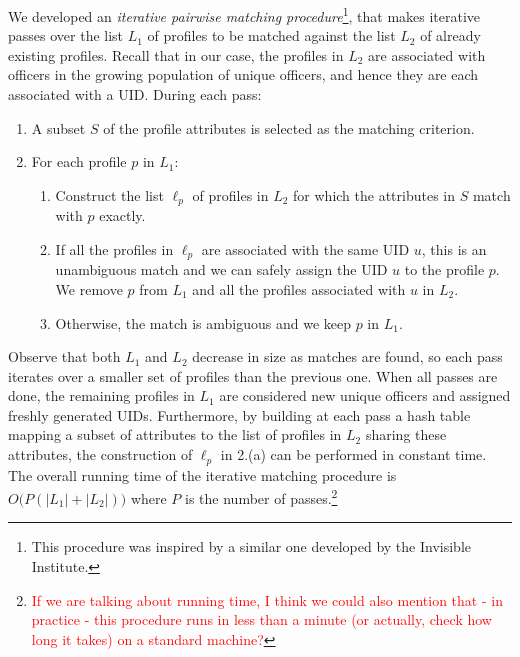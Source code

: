 We developed an \emph{iterative pairwise matching procedure}\footnote{This
procedure was inspired by a similar one developed by the Invisible Institute.},
that makes iterative passes over the list $L_1$ of profiles to be matched
against the list $L_2$ of already existing profiles. Recall that in our case,
the profiles in $L_2$ are associated with officers in the growing population of
unique officers, and hence they are each associated with a UID. During each
pass:
\begin{enumerate}
	\item A subset $S$ of the profile attributes is selected as the matching
		criterion.
	\item For each profile $p$ in $L_1$:
		\begin{enumerate}
			\item Construct the list $\ell_p$ of profiles in $L_2$ for which
				the attributes in $S$ match with $p$ exactly.
			\item If all the profiles in $\ell_p$ are associated with the same
				UID $u$, this is an unambiguous match and we can safely assign
				the UID $u$ to the profile $p$. We remove $p$ from $L_1$ and
				all the profiles associated with $u$ in $L_2$.
			\item Otherwise, the match is ambiguous and we keep $p$ in
				$L_1$.
		\end{enumerate}
\end{enumerate}
Observe that both $L_1$ and $L_2$ decrease in size as matches are found, so
each pass iterates over a smaller set of profiles than the previous one. When
all passes are done, the remaining profiles in $L_1$ are considered new
unique officers and assigned freshly generated UIDs. Furthermore, by
building at each pass a hash table mapping a subset of attributes to the
list of profiles in $L_2$ sharing these attributes, the construction of
$\ell_p$ in 2.(a) can be performed in constant time. The overall running time of the
  iterative matching procedure is $O\big(P(|L_1|+|L_2|)\big)$ where $P$ is the
  number of passes.\footnote{\textcolor{red}{If we are talking about running time, I think we could also mention that - in practice - this procedure runs in less than a minute (or actually, check how long it takes) on a standard machine?}}

